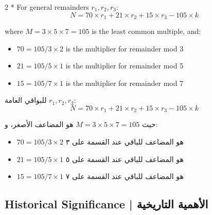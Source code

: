 \documentclass[11pt,a4paper]{article}
\newcommand{\ar}[1]{\arabicfont\beginR #1\endR}
\begin{document}
\begin{paracol}{2}
\switchcolumn[0]*\centering
For general remainders $r_1, r_2, r_3$:
\[
\boxed{N = 70 \times r_1 + 21 \times r_2 + 15 \times r_3 - 105 \times k}
\]

where $M = 3 \times 5 \times 7 = 105$ is the least common multiple, and:
\begin{itemize}[leftmargin=1.5em,itemsep=1pt]
  \item $70 = 105/3 \times 2$ is the multiplier for remainder mod 3
  \item $21 = 105/5 \times 1$ is the multiplier for remainder mod 5
  \item $15 = 105/7 \times 1$ is the multiplier for remainder mod 7
\end{itemize}

\switchcolumn
\centering
\ar{للبواقي العامة $r_1, r_2, r_3$:}
\[
\boxed{N = 70 \times r_1 + 21 \times r_2 + 15 \times r_3 - 105 \times k}
\]

\ar{حيث $M = 3 \times 5 \times 7 = 105$ هو المضاعف الأصغر، و:}
\begin{itemize}[leftmargin=1.5em,itemsep=1pt]
  \item \ar{$70 = 105/3 \times 2$ هو المضاعف للباقي عند القسمة على ٣}
  \item \ar{$21 = 105/5 \times 1$ هو المضاعف للباقي عند القسمة على ٥}
  \item \ar{$15 = 105/7 \times 1$ هو المضاعف للباقي عند القسمة على ٧}
\end{itemize}
\end{paracol}

\subsection*{Historical Significance | \ar{الأهمية التاريخية}}
\end{document}

